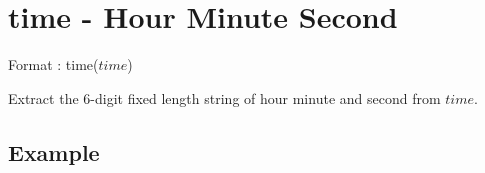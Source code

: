 
%

\section{time - Hour Minute Second\label{sect:time}}

Format : time($time$)

Extract the 6-digit fixed length string of hour minute and second from $time$. 

\subsection*{Example}


%

